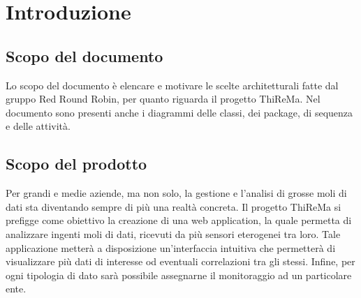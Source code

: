 \section{Introduzione}
	\subsection{Scopo del documento}
		Lo scopo del documento è elencare e motivare le scelte architetturali fatte dal gruppo Red Round Robin, per quanto riguarda il progetto ThiReMa. Nel documento sono presenti anche i diagrammi delle classi, dei package, di sequenza e delle attività.
	\subsection{Scopo del prodotto}
	 	Per grandi e medie aziende, ma non solo, la gestione e l'analisi di grosse moli di dati sta diventando sempre di più una realtà concreta.
	 	\newline
		Il progetto ThiReMa si prefigge come obiettivo la creazione di una web application, la quale permetta di analizzare ingenti moli di dati, ricevuti da più sensori eterogenei tra loro. Tale applicazione metterà a disposizione un'interfaccia intuitiva che permetterà di visualizzare più dati di interesse od eventuali correlazioni tra gli stessi. Infine, per ogni tipologia di dato sarà possibile assegnarne il monitoraggio ad un particolare ente.
	